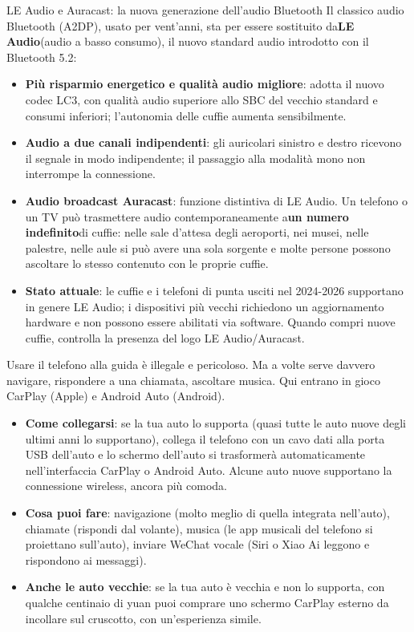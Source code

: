 \begin{tcbinfo}{LE Audio e Auracast: la nuova generazione dell'audio Bluetooth}
Il classico audio Bluetooth (A2DP), usato per vent'anni, sta per essere sostituito da\textbf{LE Audio}(audio a basso consumo), il nuovo standard audio introdotto con il Bluetooth 5.2:

\begin{itemize}
  \item \textbf{Più risparmio energetico e qualità audio migliore}: adotta il nuovo codec LC3, con qualità audio superiore allo SBC del vecchio standard e consumi inferiori; l'autonomia delle cuffie aumenta sensibilmente.
  \item \textbf{Audio a due canali indipendenti}: gli auricolari sinistro e destro ricevono il segnale in modo indipendente; il passaggio alla modalità mono non interrompe la connessione.
  \item \textbf{Audio broadcast Auracast}: funzione distintiva di LE Audio. Un telefono o un TV può trasmettere audio contemporaneamente a\textbf{un numero indefinito}di cuffie: nelle sale d'attesa degli aeroporti, nei musei, nelle palestre, nelle aule si può avere una sola sorgente e molte persone possono ascoltare lo stesso contenuto con le proprie cuffie.
  \item \textbf{Stato attuale}: le cuffie e i telefoni di punta usciti nel 2024-2026 supportano in genere LE Audio; i dispositivi più vecchi richiedono un aggiornamento hardware e non possono essere abilitati via software. Quando compri nuove cuffie, controlla la presenza del logo LE Audio/Auracast.
\end{itemize}

\end{tcbinfo}


Usare il telefono alla guida è illegale e pericoloso. Ma a volte serve davvero navigare, rispondere a una chiamata, ascoltare musica. Qui entrano in gioco CarPlay (Apple) e Android Auto (Android).

\begin{itemize}
  \item \textbf{Come collegarsi}: se la tua auto lo supporta (quasi tutte le auto nuove degli ultimi anni lo supportano), collega il telefono con un cavo dati alla porta USB dell'auto e lo schermo dell'auto si trasformerà automaticamente nell'interfaccia CarPlay o Android Auto. Alcune auto nuove supportano la connessione wireless, ancora più comoda.
  \item \textbf{Cosa puoi fare}: navigazione (molto meglio di quella integrata nell'auto), chiamate (rispondi dal volante), musica (le app musicali del telefono si proiettano sull'auto), inviare WeChat vocale (Siri o Xiao Ai leggono e rispondono ai messaggi).
  \item \textbf{Anche le auto vecchie}: se la tua auto è vecchia e non lo supporta, con qualche centinaio di yuan puoi comprare uno schermo CarPlay esterno da incollare sul cruscotto, con un'esperienza simile.
\end{itemize}

